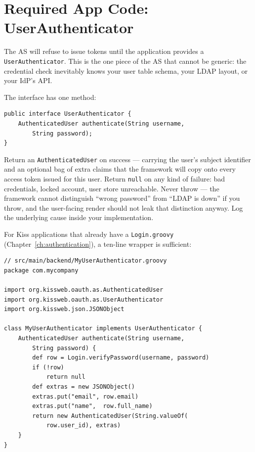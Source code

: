 \section{Required App Code: UserAuthenticator}
\label{sec:as-user-auth}

The AS will refuse to issue tokens until the application provides a {\nopagebreak}\texttt{UserAuthenticator}.  This is the one piece of the AS that cannot be generic: the credential check inevitably knows your user table schema, your LDAP layout, or your IdP's API.

The interface has one method:

\begin{lstlisting}[style=java]
public interface UserAuthenticator {
    AuthenticatedUser authenticate(String username,
        String password);
}
\end{lstlisting}

\noindent
Return an \texttt{AuthenticatedUser} on success --- carrying the user's subject identifier and an optional bag of extra claims that the framework will copy onto every access token issued for this user.  Return \texttt{null} on any kind of failure: bad credentials, locked account, user store unreachable.  Never throw --- the framework cannot distinguish ``wrong password'' from ``LDAP is down'' if you throw, and the user-facing render should not leak that distinction anyway.  Log the underlying cause inside your implementation.

For Kiss applications that already have a \texttt{Login.groovy} (Chapter~\ref{ch:authentication}), a ten-line wrapper is sufficient:

\begin{lstlisting}[style=groovy]
// src/main/backend/MyUserAuthenticator.groovy
package com.mycompany

import org.kissweb.oauth.as.AuthenticatedUser
import org.kissweb.oauth.as.UserAuthenticator
import org.kissweb.json.JSONObject

class MyUserAuthenticator implements UserAuthenticator {
    AuthenticatedUser authenticate(String username,
        String password) {
        def row = Login.verifyPassword(username, password)
        if (!row)
            return null
        def extras = new JSONObject()
        extras.put("email", row.email)
        extras.put("name",  row.full_name)
        return new AuthenticatedUser(String.valueOf(
            row.user_id), extras)
    }
}
\end{lstlisting}

